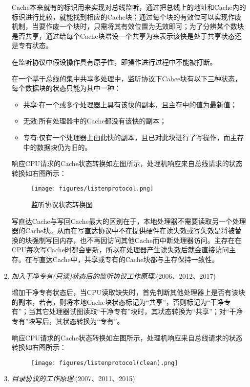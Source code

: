 \documentclass[a4paper]{ctexart}
\begin{document}
\begin{enumerate}
  Cache本来就有的标识用来实现对总线监听，通过把总线上的地址和Cache内的标识进行比较，就能找到相应的Cache块；通过每个块的有效位可以实现作废机制，当要作废一个块时，只需将其有效位置为无效即可；为了分辨某个数块是否共享，通过给每个Cache块增设一个共享为来表示该快是处于共享状态还是专有状态。
  
  在监听协议中假设操作具有原子性，即操作进行过程中不能被打断。
  
  在一个基于总线的集中共享多处理中，监听协议下Cahce块有以下三种状态，每个数据块的状态只能为其中一种：
  \begin{itemize}
    \item 共享:在一个或多个处理器上具有该快的副本，且主存中的值为最新值；
    \item 无效:所有处理器中的Cache都没有该快的副本；
    \item 专有:仅有一个处理器上由此快的副本，且已对此块进行了写操作，而主存中的数据块仍为旧的。
  \end{itemize}
  响应CPU请求的Cache状态转换如左图所示，处理机响应来自总线请求的状态转换如右图所示：
  \begin{figure}[htbp]
    \caption{监听协议状态转换图}
    \centering
    \texttt{[image: figures/listenprotocol.png]}
  \end{figure}
  
  写直达Cache与写回Cache最大的区别在于，本地处理器不需要读取另一个处理器的Cache块。从而在写直达协议中不在提供硬件在读失效或写失效是将被替换的块强制写回内存，也不再因访问其他Cache而中断处理器访问。主存在在CPU每次写Cache时都会更新，所以在处理器产生读失效后就会直接访问主存。在写直达Cache中，共享或专有的Cache块都与主存保持一致性。
  
  \item \emph{加入干净专有(只读)状态后的监听协议工作原理}:(2006、2012、2017)
  
  增加干净专有状态后，当CPU读取缺失时，首先判断其他处理器上是否有该块的副本，若有，则将本地Cache块状态标记为“共享”，否则标记为“干净专有”；当其它处理器试图读取“干净专有”块时，其状态转换为“共享”；对“干净专有”块写后，其状态转换为“专有”。
  
  响应CPU请求的Cache状态转换如左图所示，处理机响应来自总线请求的状态转换如右图所示：
  \begin{figure}[htbp]
    \centering
    \texttt{[image: figures/listenprotocol(clean).png]}
  \end{figure}
  
  
  \item \emph{目录协议的工作原理}:(2007、2011、2015)
  

\end{enumerate}
\end{document}
